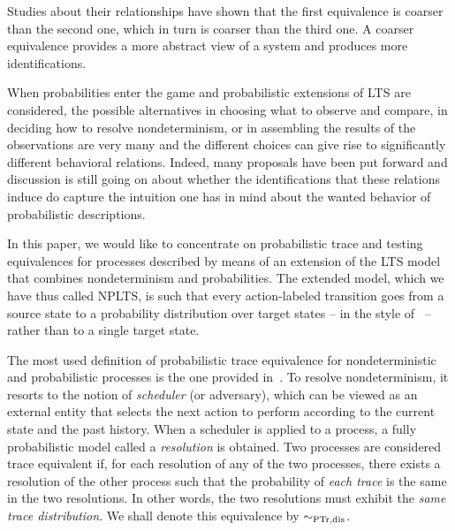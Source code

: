\documentclass{LMCS}
\newcommand{\sbis}[1]
	{\sim_{#1}}
\begin{document}
\noindent
Studies about their relationships have shown that the first equivalence is coarser than the second one,
which in turn is coarser than the third one. A coarser equivalence provides a more abstract view of a system
and produces more identifications.

When probabilities enter the game and probabilistic extensions of LTS are considered, the possible
alternatives in choosing what to observe and compare, in deciding how to resolve nondeterminism, or in
assembling the results of the observations are very many and the different choices can give rise to
significantly different behavioral relations. Indeed, many proposals have been put forward and discussion is
still going on about whether the identifications that these relations induce do capture the intuition one
has in mind about the wanted behavior of probabilistic descriptions.

In this paper, we would like to concentrate on probabilistic trace and testing equivalences for processes
described by means of an extension of the LTS model that combines nondeterminism and probabilities. The
extended model, which we have thus called NPLTS, is such that every action-labeled transition goes from a
source state to a probability distribution over target states -- in the style of~\cite{LS91,Seg95a} --
rather than to a single target state.

The most used definition of probabilistic trace equivalence for nondeterministic and probabilistic processes
is the one provided in~\cite{Seg95b}. To resolve nondeterminism, it resorts to the notion of
\emph{scheduler} (or adversary), which can be viewed as an external entity that selects the next action to
perform according to the current state and the past history. When a scheduler is applied to a process, a
fully probabilistic model called a \emph{resolution} is obtained. Two processes are considered trace
equivalent if, for each resolution of any of the two processes, there exists a resolution of the other
process such that the probability of \emph{each trace} is the same in the two resolutions. In other words,
the two resolutions must exhibit the \emph{same trace distribution}. We shall denote this equivalence by
$\sbis{\rm PTr,dis}$.
\end{document}

